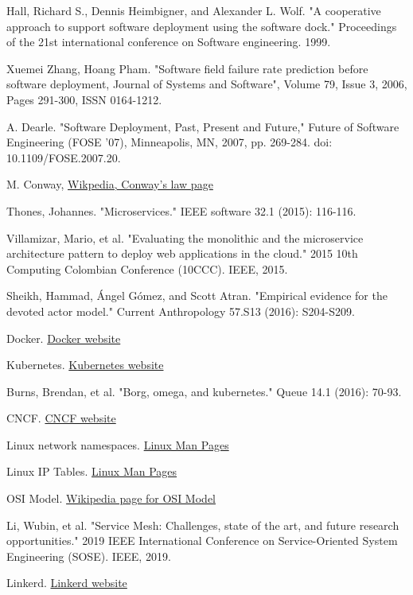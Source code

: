 \documentclass[conference]{IEEEtran}
\begin{document}
\begin{thebibliography}{00}

     Hall, Richard S., Dennis Heimbigner, and Alexander L. Wolf. "A cooperative approach to support software deployment using the software dock." Proceedings of the 21st international conference on Software engineering. 1999.

     Xuemei Zhang, Hoang Pham. "Software field failure rate prediction before software deployment, Journal of Systems and Software", Volume 79, Issue 3, 2006, Pages 291-300, ISSN 0164-1212.

     A. Dearle. "Software Deployment, Past, Present and Future," Future of Software Engineering (FOSE '07), Minneapolis, MN, 2007, pp. 269-284. doi: 10.1109/FOSE.2007.20.

     M. Conway, \href{https://en.wikipedia.org/wiki/Conway%27s_law}{Wikpedia, Conway's law page}

     Thones, Johannes. "Microservices." IEEE software 32.1 (2015): 116-116.

     Villamizar, Mario, et al. "Evaluating the monolithic and the microservice architecture pattern to deploy web applications in the cloud." 2015 10th Computing Colombian Conference (10CCC). IEEE, 2015.

     Sheikh, Hammad, Ángel Gómez, and Scott Atran. "Empirical evidence for the devoted actor model." Current Anthropology 57.S13 (2016): S204-S209.

     Docker. \href{https://www.docker.com}{Docker website}

     Kubernetes. \href{https://kubernetes.io}{Kubernetes website}

     Burns, Brendan, et al. "Borg, omega, and kubernetes." Queue 14.1 (2016): 70-93.

     CNCF. \href{https://www.cncf.io}{CNCF website}

     Linux network namespaces. \href{https://www.systutorials.com/docs/linux/man/7-network_namespaces/}{Linux Man Pages}

     Linux IP Tables. \href{https://www.systutorials.com/docs/linux/man/8-iptables/}{Linux Man Pages}

     OSI Model. \href{https://en.wikipedia.org/wiki/OSI_model}{Wikipedia page for OSI Model}

     Li, Wubin, et al. "Service Mesh: Challenges, state of the art, and future research opportunities." 2019 IEEE International Conference on Service-Oriented System Engineering (SOSE). IEEE, 2019.

     Linkerd. \href{https://linkerd.io}{Linkerd website}

\end{thebibliography}
\end{document}
